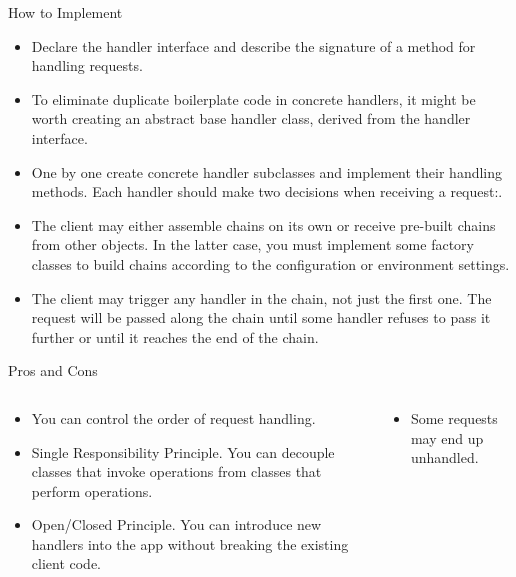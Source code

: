 \documentclass[13pt]{beamer}
\begin{document}
\begin{frame}{How to Implement}
	\begin{itemize}
		\item Declare the handler interface and describe the signature of a method for handling requests.
		\item To eliminate duplicate boilerplate code in concrete handlers, it might be worth creating an abstract base handler class, derived from the handler interface.
		\item One by one create concrete handler subclasses and implement their handling methods. Each handler should make two decisions when receiving a request:.
		\item The client may either assemble chains on its own or receive pre-built chains from other objects. In the latter case, you must implement some factory classes to build chains according to the configuration or environment settings.
		\item The client may trigger any handler in the chain, not just the first one. The request will be passed along the chain until some handler refuses to pass it further or until it reaches the end of the chain.
	\end{itemize}
\end{frame}

\begin{frame}{Pros and Cons}
	\begin{columns}[T]
		\begin{column}{.5\textwidth}
			\begin{itemize}
				\item You can control the order of request handling.
				\item Single Responsibility Principle. You can decouple classes that invoke operations from classes that perform operations.
				\item Open/Closed Principle. You can introduce new handlers into the app without breaking the existing client code.
			\end{itemize}
		\end{column}
	
		\begin{column}{.5\textwidth}
			\begin{itemize}
				\item Some requests may end up unhandled.
			\end{itemize}
		\end{column}
	\end{columns}
\end{frame}
\end{document}
